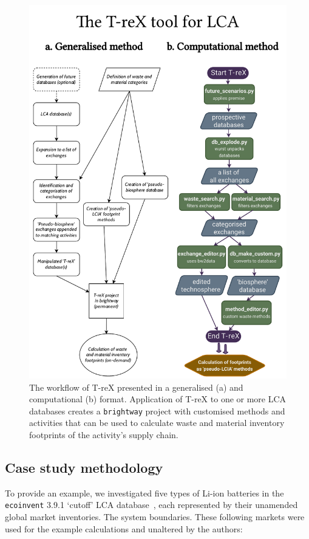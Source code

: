 \documentclass[a4paper,fleqn]{cas-dc}
\begin{document}
\begin{figure}[]
	\centering
	\includegraphics[width=1.8\columnwidth]{figs/T-reX_method.pdf}
	\caption{The workflow of T-reX presented in a generalised (a) and computational (b) format. Application of T-reX to one or more LCA databases creates a \texttt{brightway} project with customised methods and activities that can be used to calculate waste and material inventory footprints of the activity's supply chain.}\label{fig:methods-flowchart}
\end{figure}

\subsection{Case study methodology}\label{sec:method-casestudy}

To provide an example, we investigated five types of Li-ion batteries in the
\texttt{ecoinvent} 3.9.1 `cutoff' LCA database~\citep{ecoinvent2016version3},
each represented by their unamended global market inventories. The system
boundaries. These following markets were used for the example calculations and
unaltered by the authors:
\end{document}
